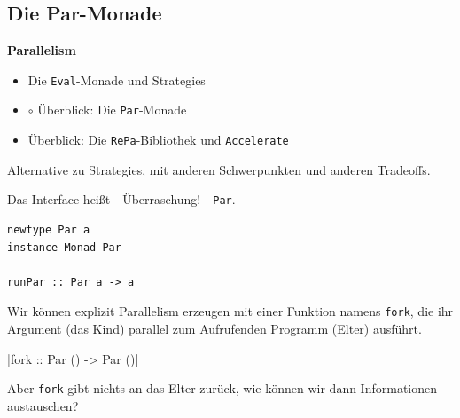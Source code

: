 \documentclass{beamer}
\begin{document}

\subsection{Die Par-Monade}

\begin{frame}[fragile]

\begin{center}
\Large
\textbf{Parallelism}\normalsize\bigskip
\begin{itemize}
\item Die \texttt{Eval}-Monade und Strategies
\item $\circ$ Überblick: Die \texttt{Par}-Monade
\item Überblick: Die \texttt{RePa}-Bibliothek und \texttt{Accelerate}
\end{itemize}
\end{center}

\end{frame}


\begin{frame}[fragile]

Alternative zu Strategies, mit anderen Schwerpunkten und anderen Tradeoffs.\pause\smallskip

Das Interface heißt - Überraschung! - \texttt{Par}.

\begin{verbatim}
newtype Par a
instance Monad Par

runPar :: Par a -> a
\end{verbatim}
\pause

Wir können explizit Parallelism erzeugen mit einer Funktion namens \texttt{fork}, die ihr Argument (das \glqq Kind\grqq ) parallel zum Aufrufenden Programm (\glqq Elter\grqq ) ausführt.

|fork :: Par () -> Par ()|
\pause

Aber \texttt{fork} gibt nichts an das Elter zurück, wie können wir dann Informationen austauschen?

\end{frame}

\end{document}
